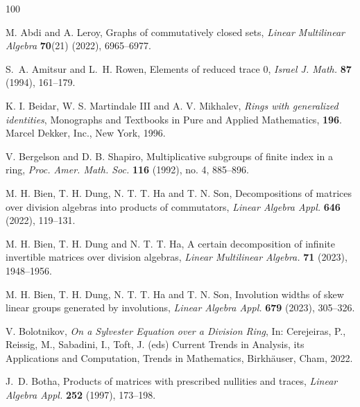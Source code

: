 \documentclass[11pt]{article}
\theoremstyle{definition}
\begin{document}
{{{{				
				\bigskip
				
				
				\begin{thebibliography}{100}
					
					
					
					 M. Abdi and A. Leroy, Graphs of commutatively closed sets, \textit{Linear  Multilinear Algebra} \textbf{70}(21) (2022), 6965--6977.	
					
					S.~A. Amitsur and L.~H.
					Rowen, Elements of reduced trace $0$,  \emph{Israel J. Math.}
					\textbf{87} (1994), 161--179.	
					
					
					  K. I. Beidar, W. S. Martindale III and A. V. Mikhalev,
					\textit{Rings with generalized identities}, Monographs and Textbooks in Pure and
					Applied Mathematics, \textbf{196}. Marcel Dekker, Inc., New York, 1996.
					
					 V. Bergelson and D. B. Shapiro,
					Multiplicative subgroups of finite index in a ring,
					\textit{Proc. Amer. Math. Soc.} \textbf{116} (1992), no. 4, 885--896.
					
					M. H. Bien, T. H. Dung, N. T. T. Ha and T. N. Son, Decompositions of matrices over division algebras into products of commutators, \emph{Linear Algebra Appl.} \textbf{646} (2022), 119--131.
					
							M. H. Bien, T. H. Dung and N. T. T. Ha, A certain decomposition of infinite invertible matrices over division algebras, \emph{Linear Multilinear Algebra.} \textbf{71} (2023), 1948--1956.
					
					
					
					M. H. Bien, T. H. Dung, N. T. T. Ha and T. N. Son, Involution widths   of skew linear groups generated by involutions, \textit{Linear Algebra Appl.} \textbf{679} (2023), 305--326.
					
					 V. Bolotnikov, \textit{On a Sylvester Equation over a Division Ring}, In: Cerejeiras, P., Reissig, M., Sabadini, I., Toft, J. (eds) Current Trends in Analysis, its Applications and Computation, Trends in Mathematics, Birkhäuser, Cham, 2022.
					
					J.~D. Botha, Products of matrices with prescribed
					nullities and traces,  \emph{Linear Algebra Appl.} \textbf{252} (1997),
					173--198.
					

\end{thebibliography}}}}}
\end{document}
